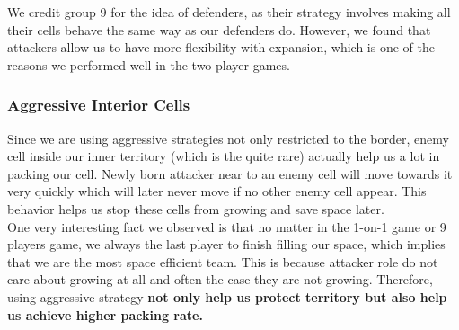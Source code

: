 We credit group 9 for the idea of defenders, as their strategy involves making all their cells behave the same way as our defenders do. However, we found that attackers allow us to have more flexibility with expansion, which is one of the reasons we performed well in the two-player games.\\

\subsubsection{Aggressive Interior Cells}
Since we are using aggressive strategies not only restricted to the border, enemy cell inside our inner territory (which is the quite rare) actually help us a lot in packing our cell. Newly born attacker near to an enemy cell will move towards it very quickly which will later never move if no other enemy cell appear. This behavior helps us stop these cells from growing and save space later.\\
One very interesting fact we observed is that no matter in the 1-on-1 game or 9 players game, we always the last player to finish filling our space, which implies that we are the most space efficient team. This is because attacker role do not care about growing at all and often the case they are not growing. Therefore, using aggressive strategy \textbf{not only help us protect territory but also help us achieve higher packing rate.}\\

